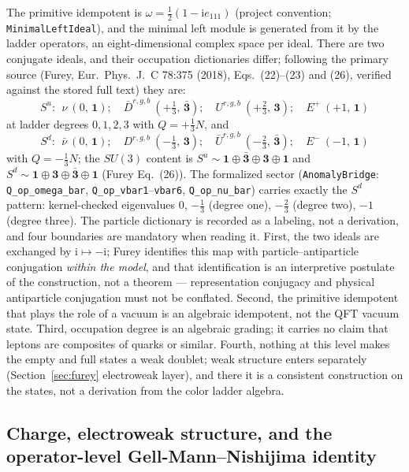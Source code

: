 \documentclass[11pt]{article}
\newcommand{\ii}{\mathrm{i}}
\newcommand{\leanname}[1]{\texttt{#1}}
\begin{document}
The primitive idempotent is $\omega = \tfrac12(1 - \ii e_{111})$
(project convention; \leanname{MinimalLeftIdeal}), and the minimal left
module is generated from it by the ladder operators, an
eight-dimensional complex space per ideal.  There are two conjugate
ideals, and their occupation dictionaries differ; following the primary
source (Furey, Eur.\ Phys.\ J.\ C 78:375 (2018), Eqs.~(22)--(23) and
(26), verified against the stored full text) they are:
\[
S^u:\ \ \nu\ (0,\,\mathbf{1});\quad
\bar D^{r,g,b}\ (+\tfrac13,\,\bar{\mathbf 3});\quad
U^{r,g,b}\ (+\tfrac23,\,\mathbf 3);\quad
E^{+}\ (+1,\,\mathbf 1)
\]
at ladder degrees $0,1,2,3$ with $Q = +\tfrac13 N$, and
\[
S^d:\ \ \bar\nu\ (0,\,\mathbf{1});\quad
D^{r,g,b}\ (-\tfrac13,\,\mathbf 3);\quad
\bar U^{r,g,b}\ (-\tfrac23,\,\bar{\mathbf 3});\quad
E^{-}\ (-1,\,\mathbf 1)
\]
with $Q = -\tfrac13 N$; the $SU(3)$ content is
$S^u \sim \mathbf 1 \oplus \bar{\mathbf 3} \oplus \mathbf 3 \oplus
\mathbf 1$ and
$S^d \sim \mathbf 1 \oplus \mathbf 3 \oplus \bar{\mathbf 3} \oplus
\mathbf 1$ (Furey Eq.~(26)).  The formalized sector
(\leanname{AnomalyBridge}: \leanname{Q\_op\_omega\_bar},
\leanname{Q\_op\_vbar1}--\leanname{vbar6}, \leanname{Q\_op\_nu\_bar})
carries exactly the $S^d$ pattern: kernel-checked eigenvalues $0$,
$-\tfrac13$ (degree one), $-\tfrac23$ (degree two), $-1$ (degree
three).  The particle dictionary is recorded as a labeling, not a
derivation, and four boundaries are mandatory when reading it.  First,
the two ideals are exchanged by $\ii \mapsto -\ii$; Furey identifies
this map with particle--antiparticle conjugation \emph{within the
model}, and that identification is an interpretive postulate of the
construction, not a theorem --- representation conjugacy and physical
antiparticle conjugation must not be conflated.  Second, the primitive
idempotent that plays the role of a vacuum is an algebraic idempotent,
not the QFT vacuum state.  Third, occupation degree is an algebraic
grading; it carries no claim that leptons are composites of quarks or
similar.  Fourth, nothing at this level makes the empty and full states
a weak doublet; weak structure enters separately
(Section~\ref{sec:furey} electroweak layer), and there it is a
consistent construction on the states, not a derivation from the color
ladder algebra.

\subsection{Charge, electroweak structure, and the operator-level
Gell-Mann--Nishijima identity}
\end{document}
